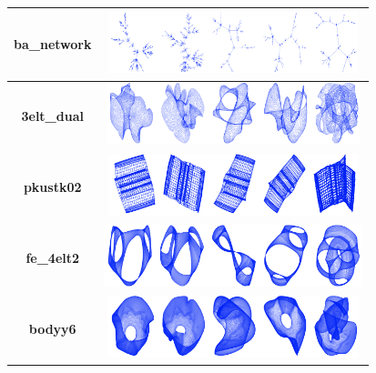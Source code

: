 \documentclass{vgtc}
\begin{document}
\begin{table}[!t]
\begin{tabular}{|c|p{2.5cm}|p{2.6cm}|p{2.6cm}|p{2.6cm}|p{2.5cm}|}
\textbf{ba\_network}        & \multicolumn{5}{c|}{\includegraphics[height=1.8cm,width=0.8\linewidth]{layouts/convergedlayouts/ba_network_converged.png}}                                                                                                                 \\ \hline
\textbf{3elt\_dual}        & \multicolumn{5}{c|}{\includegraphics[height=1.8cm,width=0.8\linewidth]{layouts/convergedlayouts/3elt_dual_converged.png} }                                                                                                                                                        \\ \hline
\textbf{pkustk02}        & \multicolumn{5}{c|}{\includegraphics[height=1.8cm,width=0.8\linewidth]{layouts/convergedlayouts/pkustk02_converged.png}}                                                                                                                 \\ \hline
\textbf{fe\_4elt2}        & \multicolumn{5}{c|}{\includegraphics[height=1.8cm,width=0.8\linewidth]{layouts/convergedlayouts/fe_4elt2_converged.png}}                                                                                                                 \\ \hline
\textbf{bodyy6}        & \multicolumn{5}{c|}{\includegraphics[height=1.8cm,width=0.8\linewidth]{layouts/convergedlayouts/bodyy6_converged.png}}                                                                                                                 \\ \hline


\end{tabular}
\end{table}
\end{document}
